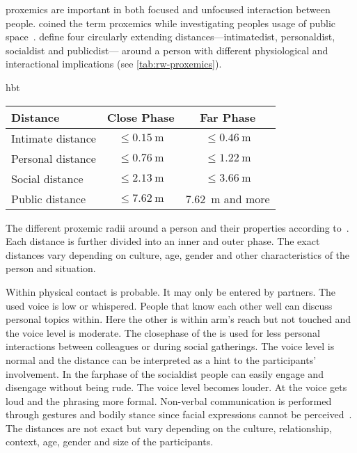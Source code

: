 \Gls{proxemics} are important in both focused and \gls{unfocused interaction} between people.
 coined the term \gls{proxemics} while investigating peoples usage of public space~\cite[]{Hall1969}.
 define four circularly extending distances---\gls{intimatedist}, \gls{personaldist}, \gls{socialdist} and \gls{publicdist}--- around a person with different physiological and interactional implications (see \cref{tab:rw-proxemics}).
\begin{colored_table}{hbt}
  \centering
    \begin{tabulary}{\textwidth}{ l C C }
      \toprule
        Distance          & Close Phase                & Far Phase                  \\ \midrule
        Intimate distance & \(\leq \SI{0.15}{\meter}\) & \(\leq \SI{0.46}{\meter}\) \\
        Personal distance & \(\leq \SI{0.76}{\meter}\) & \(\leq \SI{1.22}{\meter}\) \\
        Social distance   & \(\leq \SI{2.13}{\meter}\) & \(\leq \SI{3.66}{\meter}\) \\
        Public distance   & \(\leq \SI{7.62}{\meter}\) & \SI{7.62}{\meter} and more \\
        \bottomrule
    \end{tabulary}
    \caption[Proxemic radii according to~\citeauthor*{Hall1969}.]{\label{tab:rw-proxemics} The different proxemic radii around a person and their properties according to~.
    Each distance is further divided into an inner and outer phase. 
    The exact distances vary depending on culture, age, gender and other characteristics of the person and situation.
   }
\end{colored_table}
Within physical contact is probable.
It may only be entered by partners.
The used voice is low or whispered.
People that know each other well can discuss personal topics within.
Here the other is within arm's reach but not touched and the voice level is moderate.
The \gls{closephase} of the is used for less personal interactions between colleagues or during social gatherings.
The voice level is normal and the distance can be interpreted as a hint to the participants' involvement.
In the \gls{farphase} of the \gls{socialdist} people can easily engage and disengage without being rude.
The voice level becomes louder.
At the voice gets loud and the phrasing more formal.
Non-verbal communication is performed through gestures and bodily stance since facial expressions cannot be perceived~\cite[p.117-125]{Hall1969}.
The distances are not exact but vary depending on the culture, relationship, context, age, gender and size of the participants.


